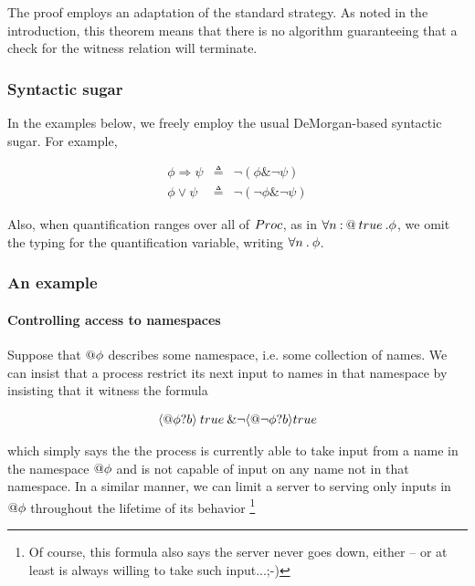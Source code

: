 The proof employs an adaptation of the standard strategy. As noted in
the introduction, this theorem means that there is no algorithm
guaranteeing that a check for the witness relation will terminate.

\subsubsection{Syntactic sugar }

In the examples below, we freely employ the usual DeMorgan-based
syntactic sugar. For example,

\begin{eqnarray}
	\phi \Rightarrow \psi & \triangleq & \neg ( \phi \& \neg \psi ) \nonumber\\
	\phi \vee \psi & \triangleq & \neg ( \neg \phi \& \neg \psi ) \nonumber
\end{eqnarray}

Also, when quantification ranges over all of $\mathbin{Proc}$, as in
$\forall n \mathbin{:} \mathsf{@} \mathbin{true} \mathbin{.} \phi$, we omit the typing for the
quantification variable, writing $\forall n \mathbin{.} \phi$.

\subsubsection{An example}

\paragraph{Controlling access to namespaces}

Suppose that $\mathsf{@} \phi$ describes some namespace, i.e. some
collection of names. We can insist that a process restrict its next
input to names in that namespace by insisting that it witness the formula

\begin{eqnarray}
  \langle \mathsf{@} \phi ? b \rangle \mathbin{true} \& \neg \langle \mathsf{@} \neg \phi ? b \rangle \mathbin{true} \nonumber
\end{eqnarray}

which simply says the the process is currently able to take input from
a name in the namespace $\mathsf{@} \phi$ and is not capable of input on
any name not in that namespace. In a similar manner, we can limit a
server to serving only inputs in $\mathsf{@} \phi$ throughout the
lifetime of its behavior \footnote{Of course, this formula also says
  the server never goes down, either -- or at least is always willing
  to take such input...;-)}

